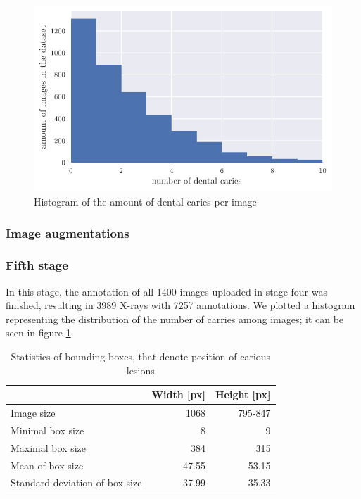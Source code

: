 \begin{figure}
    \includegraphics[width=\linewidth]{images/caries_histogram.pdf}
    \caption{Histogram of the amount of dental caries per image}
    \label{fig:hist_caries_per_img}
\end{figure}
\subsubsection{Image augmentations}

\subsubsection{Fifth stage}
In this stage, the annotation of all 1400 images uploaded in stage four was finished, resulting in 3989 X-rays with 7257 annotations. We plotted a histogram representing the distribution of the number of carries among images; it can be seen in figure \ref{fig:hist_caries_per_img}.


\begin{table}
    \centering
    \begin{tabular}{l|r|r}
                                       & Width [px] & Height [px] \\\hline
        Image size                     & 1068       & 795-847     \\ \hline
        Minimal box size               & 8          & 9           \\ \hline
        Maximal box size               & 384        & 315         \\ \hline
        Mean of box size               & 47.55      & 53.15       \\ \hline
        Standard deviation of box size & 37.99      & 35.33       \\ \hline
    \end{tabular}
    \caption{\label{tab:dataset_statistics}Statistics of bounding boxes, that denote position of carious lesions}
\end{table}

